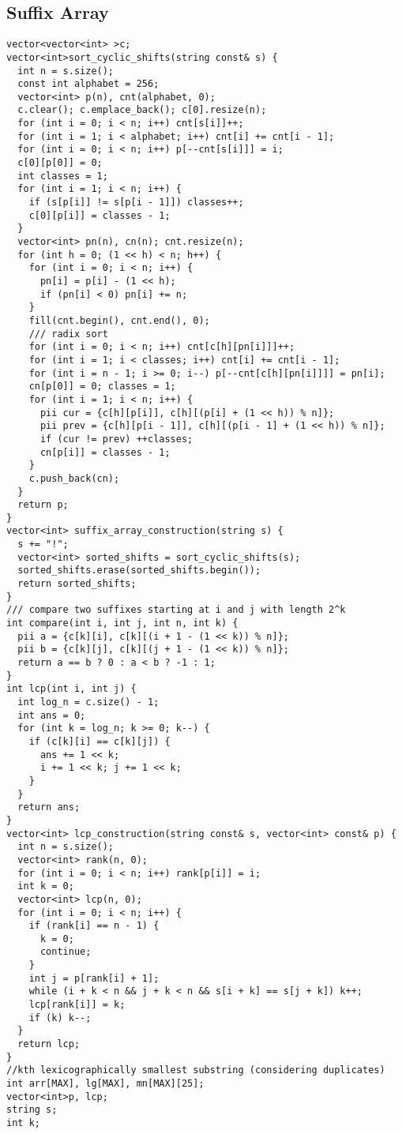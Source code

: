 \documentclass[10pt,a4paper,onesided]{article}
\begin{document}
\begin{multicols*}{3}
\subsection{Suffix Array}
\begin{lstlisting}
vector<vector<int> >c;
vector<int>sort_cyclic_shifts(string const& s) {
  int n = s.size();
  const int alphabet = 256;
  vector<int> p(n), cnt(alphabet, 0);
  c.clear(); c.emplace_back(); c[0].resize(n);
  for (int i = 0; i < n; i++) cnt[s[i]]++;
  for (int i = 1; i < alphabet; i++) cnt[i] += cnt[i - 1];
  for (int i = 0; i < n; i++) p[--cnt[s[i]]] = i;
  c[0][p[0]] = 0;
  int classes = 1;
  for (int i = 1; i < n; i++) {
    if (s[p[i]] != s[p[i - 1]]) classes++;
    c[0][p[i]] = classes - 1;
  }
  vector<int> pn(n), cn(n); cnt.resize(n);
  for (int h = 0; (1 << h) < n; h++) {
    for (int i = 0; i < n; i++) {
      pn[i] = p[i] - (1 << h);
      if (pn[i] < 0) pn[i] += n;
    }
    fill(cnt.begin(), cnt.end(), 0);
    /// radix sort
    for (int i = 0; i < n; i++) cnt[c[h][pn[i]]]++;
    for (int i = 1; i < classes; i++) cnt[i] += cnt[i - 1];
    for (int i = n - 1; i >= 0; i--) p[--cnt[c[h][pn[i]]]] = pn[i];
    cn[p[0]] = 0; classes = 1;
    for (int i = 1; i < n; i++) {
      pii cur = {c[h][p[i]], c[h][(p[i] + (1 << h)) % n]};
      pii prev = {c[h][p[i - 1]], c[h][(p[i - 1] + (1 << h)) % n]};
      if (cur != prev) ++classes;
      cn[p[i]] = classes - 1;
    }
    c.push_back(cn);
  }
  return p;
}
vector<int> suffix_array_construction(string s) {
  s += "!";
  vector<int> sorted_shifts = sort_cyclic_shifts(s);
  sorted_shifts.erase(sorted_shifts.begin());
  return sorted_shifts;
}
/// compare two suffixes starting at i and j with length 2^k
int compare(int i, int j, int n, int k) {
  pii a = {c[k][i], c[k][(i + 1 - (1 << k)) % n]};
  pii b = {c[k][j], c[k][(j + 1 - (1 << k)) % n]};
  return a == b ? 0 : a < b ? -1 : 1;
}
int lcp(int i, int j) {
  int log_n = c.size() - 1;
  int ans = 0;
  for (int k = log_n; k >= 0; k--) {
    if (c[k][i] == c[k][j]) {
      ans += 1 << k;
      i += 1 << k; j += 1 << k;
    }
  }
  return ans;
}
vector<int> lcp_construction(string const& s, vector<int> const& p) {
  int n = s.size();
  vector<int> rank(n, 0);
  for (int i = 0; i < n; i++) rank[p[i]] = i; 
  int k = 0;
  vector<int> lcp(n, 0);
  for (int i = 0; i < n; i++) {
    if (rank[i] == n - 1) {
      k = 0;
      continue;
    }
    int j = p[rank[i] + 1];
    while (i + k < n && j + k < n && s[i + k] == s[j + k]) k++;
    lcp[rank[i]] = k;
    if (k) k--;
  }
  return lcp;
}
//kth lexicographically smallest substring (considering duplicates)
int arr[MAX], lg[MAX], mn[MAX][25];
vector<int>p, lcp;
string s;
int k;


\end{lstlisting}
\end{multicols*}
\end{document}
